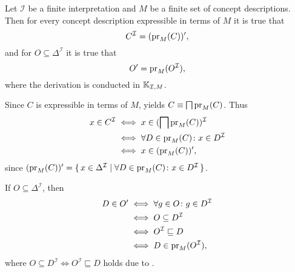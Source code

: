 \begin{Proposition}
  \label{prop:connection-I-prime-1}
  Let $\mathcal{I}$ be a finite interpretation and $M$ be a finite set of concept
  descriptions.  Then for every concept description expressible in terms of $M$ it is true
  that
  \begin{equation*}
    C^{\mathcal{I}} = (\operatorname{pr}_M(C))',
  \end{equation*}
  and for $O \subseteq \Delta^{\mathcal{I}}$ it is true that
  \begin{equation*}
    O' = \operatorname{pr}_M(O^{\mathcal{I}}),
  \end{equation*}
  where the derivation is conducted in ${\mathbb{K}}_{\mathcal{I}, M}$.
\end{Proposition}
\begin{Proof}
  Since $C$ is expressible in terms of $M$,
   yields $C \equiv \bigsqcap \operatorname{pr}_M(C)$.
  Thus
  \begin{align*}
    x \in C^{\mathcal{I}}
    & \iff x \in (\bigsqcap \operatorname{pr}_M(C))^{\mathcal{I}} \\
    & \iff \forall D \in \operatorname{pr}_M(C) \colon x \in D^{\mathcal{I}} \\
    & \iff x \in (\operatorname{pr}_M(C))',
  \end{align*}
  since $(\operatorname{pr}_M(C))' = {\{\, x \in \Delta^{\mathcal{I}} \mid \forall D \in \operatorname{pr}_M(C) \colon
    x \in D^{\mathcal{I}} \,\}}$.

  If $O \subseteq \Delta^{\mathcal{I}}$, then
  \begin{align*}
    D \in O'
    & \iff \forall g \in O \colon g \in D^{\mathcal{I}} \\
    & \iff O \subseteq D^{\mathcal{I}} \\
    & \iff O^{\mathcal{I}} \sqsubseteq D \\
    & \iff D \in \operatorname{pr}_M(O^{\mathcal{I}}),
  \end{align*}
  where $O \subseteq D^{\mathcal{I}} \iff O^{\mathcal{I}} \sqsubseteq D$ holds due to
  .
\end{Proof}

